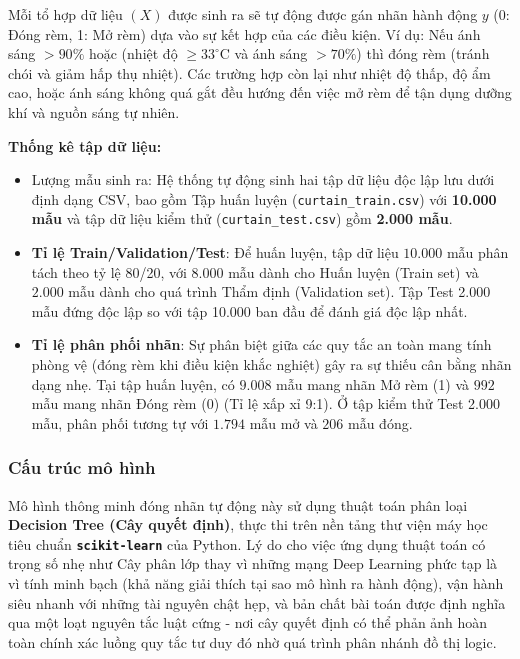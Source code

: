 Mỗi tổ hợp dữ liệu $(X)$ được sinh ra sẽ tự động được gán nhãn hành động $y$ (0: Đóng rèm, 1: Mở rèm) dựa vào sự kết hợp của các điều kiện. Ví dụ: Nếu ánh sáng $> 90\%$ hoặc (nhiệt độ $\ge 33^\circ$C và ánh sáng $> 70\%$) thì đóng rèm (tránh chói và giảm hấp thụ nhiệt). Các trường hợp còn lại như nhiệt độ thấp, độ ẩm cao, hoặc ánh sáng không quá gắt đều hướng đến việc mở rèm để tận dụng dưỡng khí và nguồn sáng tự nhiên.

\textbf{Thống kê tập dữ liệu:}
\begin{itemize}
    \item Lượng mẫu sinh ra: Hệ thống tự động sinh hai tập dữ liệu độc lập lưu dưới định dạng CSV, bao gồm Tập huấn luyện (\texttt{curtain\_train.csv}) với \textbf{10.000 mẫu} và tập dữ liệu kiểm thử (\texttt{curtain\_test.csv}) gồm \textbf{2.000 mẫu}.
    \item \textbf{Tỉ lệ Train/Validation/Test}: Để huấn luyện, tập dữ liệu $10.000$ mẫu phân tách theo tỷ lệ 80/20, với $8.000$ mẫu dành cho Huấn luyện (Train set) và $2.000$ mẫu dành cho quá trình Thẩm định (Validation set). Tập Test 2.000 mẫu đứng độc lập so với tập 10.000 ban đầu để đánh giá độc lập nhất.
    \item \textbf{Tỉ lệ phân phối nhãn}: Sự phân biệt giữa các quy tắc an toàn mang tính phòng vệ (đóng rèm khi điều kiện khắc nghiệt) gây ra sự thiếu cân bằng nhãn dạng nhẹ. Tại tập huấn luyện, có $9.008$ mẫu mang nhãn Mở rèm (1) và $992$ mẫu mang nhãn Đóng rèm (0) (Tỉ lệ xấp xỉ 9:1). Ở tập kiểm thử Test 2.000 mẫu, phân phối tương tự với $1.794$ mẫu mở và $206$ mẫu đóng.
\end{itemize}

\subsubsection{Cấu trúc mô hình}
Mô hình thông minh đóng nhãn tự động này sử dụng thuật toán phân loại \textbf{Decision Tree (Cây quyết định)}, thực thi trên nền tảng thư viện máy học tiêu chuẩn \textbf{\texttt{scikit-learn}} của Python. 
Lý do cho việc ứng dụng thuật toán có trọng số nhẹ như Cây phân lớp thay vì những mạng Deep Learning phức tạp là vì tính minh bạch (khả năng giải thích tại sao mô hình ra hành động), vận hành siêu nhanh với những tài nguyên chật hẹp, và bản chất bài toán được định nghĩa qua một loạt nguyên tắc luật cứng - nơi cây quyết định có thể phản ảnh hoàn toàn chính xác luồng quy tắc tư duy đó nhờ quá trình phân nhánh đồ thị logic.

